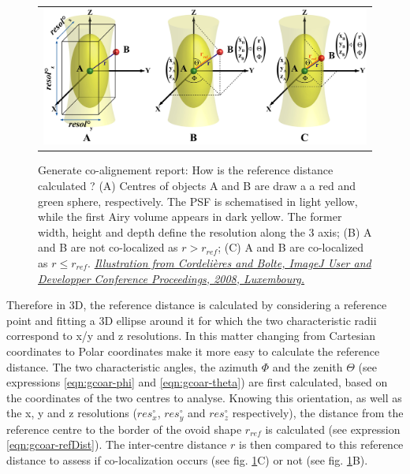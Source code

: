 \documentclass[a4paper, 11pt]{report}%
\begin{document}
\begin{enumerate*}
	\begin{figure}[!ht]
		\begin{center}
			\begin{tabular}{c}
				\includegraphics[width=0.9\linewidth]{img/gcoar-dist}
			\end{tabular}
		\end{center}
		\caption{\label{fig:gcoar-dist}Generate co-alignement report: How is the reference distance calculated ? (A) Centres of objects A and B are draw a a red and green sphere, respectively. The PSF is schematised in light yellow, while the first Airy volume appears in dark yellow. The former width, height and depth define the resolution along the 3 axis; (B) A and B are not co-localized as $r>r_{ref}$; (C) A and B are co-localized as $r\le r_{ref}$.\newline
\href{http://imagejdocu.tudor.lu/lib/exe/fetch.php?media=plugin:analysis:jacop_2.0:just_another_colocalization_plugin:jacop_ijconf2008.pdf}{\textit{Illustration from Cordelières and Bolte, ImageJ User and Developper Conference Proceedings, 2008, Luxembourg.}}}
	\end{figure}
	
Therefore in 3D, the reference distance is calculated by considering a reference point and fitting a 3D ellipse around it for which the two characteristic radii correspond to x/y and z resolutions. In this matter changing from Cartesian coordinates to Polar coordinates make it more easy to calculate the reference distance. The two characteristic angles, the azimuth $\Phi$ and the zenith $\Theta$ (see expressions \ref{eqn:gcoar-phi} and \ref{eqn:gcoar-theta}) are first calculated, based on the coordinates of the two centres to analyse. Knowing this orientation, as well as the x, y and z resolutions ($res^\circ_{x}$, $res^\circ_{y}$ and $res^\circ_{z}$ respectively), the distance from the reference centre to the border of the ovoid shape \textbf{$r_{ref}$} is calculated (see expression \ref{eqn:gcoar-refDist}). The inter-centre distance \textbf{$r$} is then compared to this reference distance to assess if co-localization occurs (see fig. \ref{fig:gcoar-dist}C) or not (see fig. \ref{fig:gcoar-dist}B).
	

\end{enumerate*}
\end{document}

